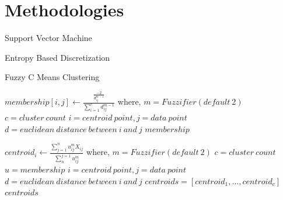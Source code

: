 \documentclass[12pt,a4paper,final]{report}
\begin{document}
\section{Methodologies}
\begin{algorithm}
\caption{Support Vector Machine}
\begin{algorithmic}[1]
\State
\end{algorithmic}
\end{algorithm}

\begin{algorithm}
\caption{Entropy Based Discretization}
\begin{algorithmic}[1]
\State
\end{algorithmic}
\end{algorithm}

\begin{algorithm}
\caption{Fuzzy C Means Clustering}
\begin{algorithmic}[1]
\State $membership[i,j] \leftarrow \frac{\frac{-2}{d_{ij}^{m-1}}}{\sum_{i=1}^{c}{{d_{ij}^{m-1}}}}$
\newline
\hspace*{1cm}
where, 
\newline
\hspace*{1cm}
$m = Fuzzifier (default\ 2)$
\newline
\hspace*{1cm}
$c = cluster\ count$
\newline
\hspace*{1cm}
$i = centroid\ point, j = data\ point$
\newline
\hspace*{1cm}
$d = euclidean\ distance\ between\ i\ and\ j$
\State \Return $membership$
\EndFunction

\State $centroid_{i} \leftarrow \frac{\sum_{j=1}^{n}u_{ij}^{m}X_{ij}}{\sum_{n}^{j=1}u_{ij}^{m}}$
\newline
\hspace*{1cm}
where, 
\newline
\hspace*{1cm}
$m = Fuzzifier (default\ 2)$
\newline
\hspace*{1cm}
$c = cluster\ count$
\newline
\hspace*{1cm}
$u = membership$
\newline
\hspace*{1cm}
$i = centroid\ point, j = data\ point$
\newline
\hspace*{1cm}
$d = euclidean\ distance\ between\ i\ and\ j$
\State $centroids = [ centroid_1, \ldots, centroid_c ]$
\State \Return $centroids$
\EndFunction


\end{algorithmic}
\end{algorithm}
\end{document}
